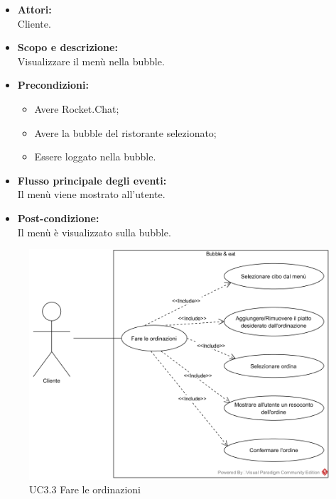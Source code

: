 
\begin{itemize}
	\item \textbf{Attori:}
	\\Cliente.
	\item \textbf{Scopo e descrizione:} 
	\\Visualizzare il menù nella bubble.
	\item \textbf{Precondizioni:}
	\begin{itemize}
		\item Avere Rocket.Chat;
		\item Avere la bubble del ristorante selezionato;
		\item Essere loggato nella bubble.
	\end{itemize}
	\item \textbf{Flusso principale degli eventi:}
	\\Il menù viene mostrato all'utente.
	\item \textbf{Post-condizione:}
	\\Il menù è visualizzato sulla bubble.
\end{itemize}


\begin{figure}[H]
	\centering
	\includegraphics[width=15cm]{../../documenti/AnalisiDeiRequisiti/Diagrammi_img/uc3_3.png}
	\caption{UC3.3 Fare le ordinazioni}
\end{figure}

